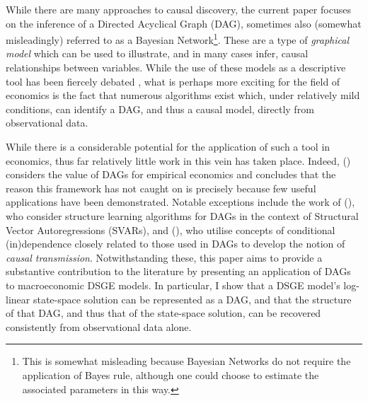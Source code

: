 \documentclass{article}
\begin{document}
While there are many approaches to causal discovery, the current paper focuses on the inference of a Directed Acyclical Graph (DAG), sometimes also (somewhat misleadingly) referred to as a Bayesian Network\footnote{This is somewhat misleading because Bayesian Networks do not require the application of Bayes rule, although one could choose to estimate the associated parameters in this way.}. These are a type of \textit{graphical model} which can be used to illustrate, and in many cases infer, causal relationships between variables. While the use of these models as a descriptive tool has been fiercely debated \parencite{pearl2018book}, what is perhaps more exciting for the field of economics is the fact that numerous algorithms exist which, under relatively mild conditions, can identify a DAG, and thus a causal model, directly from observational data.

While there is a considerable potential for the application of such a tool in economics, thus far relatively little work in this vein has taken place. Indeed, \citeauthor{imbens2019potential} (\citeyear{imbens2019potential}) considers the value of DAGs for empirical economics and concludes that the reason this framework has not caught on is precisely because few useful applications have been demonstrated. Notable exceptions include the work of \citeauthor{demiralp2003searching} (\citeyear{demiralp2003searching}), who consider structure learning algorithms for DAGs in the context of Structural Vector Autoregressions (SVARs), and \citeauthor{bazinas2015causal} (\citeyear{bazinas2015causal}), who utilise concepts of conditional (in)dependence closely related to those used in DAGs to develop the notion of \textit{causal transmission}. Notwithstanding these, this paper aims to provide a substantive contribution to the literature by presenting an application of DAGs to macroeconomic DSGE models. In particular, I show that a DSGE model's log-linear state-space solution can be represented as a DAG, and that the structure of that DAG, and thus that of the state-space solution, can be recovered consistently from observational data alone. 
\end{document}
